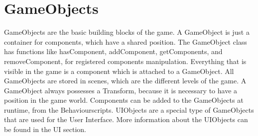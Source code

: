 \section{GameObjects}
GameObjects are the basic building blocks of the game.
A GameObject is just a container for components, which have a shared position.
The GameObject class has functions like hasComponent, addComponent, getComponents, and removeComponent, for registered components manipulation.
Everything that is visible in the game is a component which is attached to a GameObject.
All GameObjects are stored in scenes, which are the different levels of the game.
A GameObject always possesses a Transform, because it is necessary to have a position in the game world.
Components can be added to the GameObjects at runtime, from the Behaviourscripts.
UIObjects are a special type of GameObjects that are used for the User Interface.
More information about the UIObjects can be found in the UI section.

